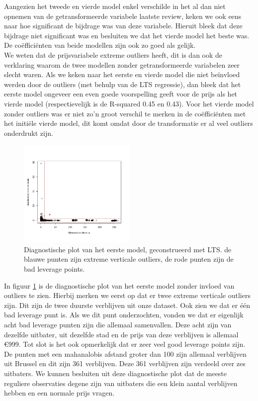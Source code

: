 \documentclass[a4paper,kulak]{kulakarticle} %
\begin{document}
Aangezien het tweede en vierde model enkel verschilde in het al dan niet opnemen van de getransformeerde variabele laatste review, keken we ook eens naar hoe significant de bijdrage was van deze variabele. Hieruit bleek dat deze bijdrage niet significant was en besluiten we dat het vierde model het beste was. De co\"effici\"enten van beide modellen zijn ook zo goed als gelijk.\\


We weten dat de prijsvariabele extreme outliers heeft, dit is dan ook de verklaring waarom de twee modellen zonder getransformeerde variabelen zeer slecht waren. Als we keken naar het eerste en vierde model die niet be\"invloed werden door de outliers (met behulp van de LTS regressie), dan bleek dat het eerste model ongeveer een even goede voorspelling geeft voor de prijs als het vierde model (respectievelijk is de R-squared 0.45 en 0.43). Voor het vierde model zonder outliers was er niet zo'n groot verschil te merken in de co\"effici\"enten met het initi\"ele vierde model, dit komt omdat door de transformatie er al veel outliers onderdrukt zijn.\\
\begin{figure}[H]
	\begin{center}
		\includegraphics[width=0.5\textwidth]{diagnosticPlot2eVr.jpeg}
	\end{center}
	\caption{Diagnostische plot van het eerste model, geconstrueerd met LTS. de blauwe punten zijn extreme verticale outliers, de rode punten zijn de bad leverage points.}
	\label{fig:diagnPlot}
\end{figure}
In figuur \ref{fig:diagnPlot} is de diagnostische plot van het eerste model zonder invloed van outliers te zien. Hierbij merken we eerst op dat er twee extreme verticale outliers zijn. Dit zijn de twee duurste verblijven uit onze dataset. Ook zien we dat er \'e\'en bad leverage punt is. Als we dit punt onderzochten, vonden we dat er eigenlijk acht bad leverage punten zijn die allemaal samenvallen. Deze acht zijn van dezelfde uitbater, uit dezelfde stad en de prijs van deze verblijven is allemaal \euro999. Tot slot is het ook opmerkelijk dat er zeer veel good leverage points zijn. De punten met een mahanalobis afstand groter dan 100 zijn allemaal verblijven uit Brussel en dit zijn 361 verblijven. Deze 361 verblijven zijn verdeeld over zes uitbaters. We kunnen besluiten uit deze diagnostische plot dat de meeste reguliere observaties degene zijn van uitbaters die een klein aantal verblijven hebben en een normale prijs vragen. 
\end{document}

